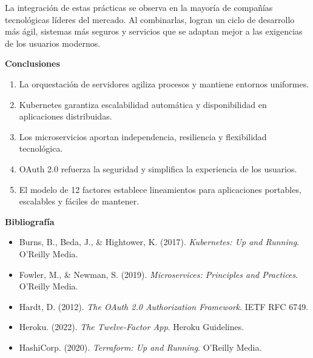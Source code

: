 \documentclass[12pt,letterpaper]{article}
\begin{document}
La integración de estas prácticas se observa en la mayoría de compañías tecnológicas líderes del mercado. Al combinarlas, logran un ciclo de desarrollo más ágil, sistemas más seguros y servicios que se adaptan mejor a las exigencias de los usuarios modernos.

\textbf{Conclusiones}
\begin{enumerate}
    \item La orquestación de servidores agiliza procesos y mantiene entornos uniformes.  
    \item Kubernetes garantiza escalabilidad automática y disponibilidad en aplicaciones distribuidas.  
    \item Los microservicios aportan independencia, resiliencia y flexibilidad tecnológica.  
    \item OAuth 2.0 refuerza la seguridad y simplifica la experiencia de los usuarios.  
    \item El modelo de 12 factores establece lineamientos para aplicaciones portables, escalables y fáciles de mantener.  
\end{enumerate}

\textbf{Bibliografía}
\begin{itemize}
    \item Burns, B., Beda, J., \& Hightower, K. (2017). \textit{Kubernetes: Up and Running}. O’Reilly Media.
    \item Fowler, M., \& Newman, S. (2019). \textit{Microservices: Principles and Practices}. O’Reilly Media.
    \item Hardt, D. (2012). \textit{The OAuth 2.0 Authorization Framework}. IETF RFC 6749.
    \item Heroku. (2022). \textit{The Twelve-Factor App}. Heroku Guidelines.
    \item HashiCorp. (2020). \textit{Terraform: Up and Running}. O’Reilly Media.
\end{itemize}
\end{document}
